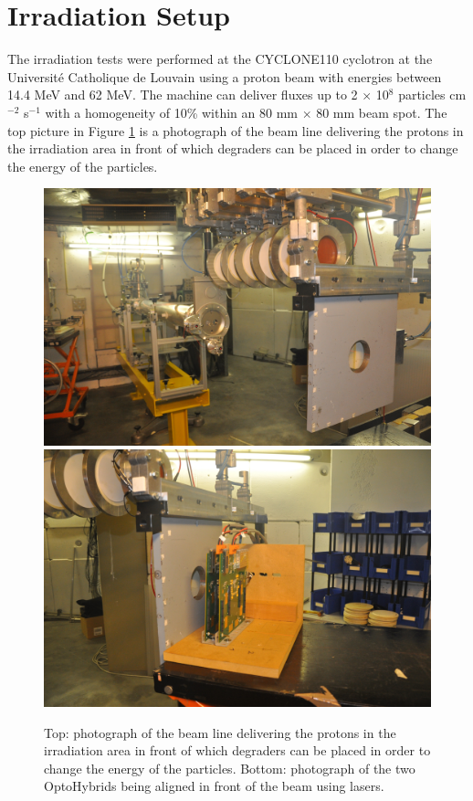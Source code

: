   \section{Irradiation Setup}

    The irradiation tests were performed at the CYCLONE110 cyclotron at the Université Catholique de Louvain \cite{CYCLOTRON} using a proton beam with energies between 14.4 MeV and 62 MeV. The machine can deliver fluxes up to 2 $ \times $ 10$^8$ particles cm$^{-2}$ s$^{-1}$ with a homogeneity of 10\% within an 80 mm $ \times $ 80 mm beam spot. The top picture in Figure \ref{fig:II-6-cyclotron} is a photograph of the beam line delivering the protons in the irradiation area in front of which degraders can be placed in order to change the energy of the particles. \\

    \begin{figure}[p!]
      \centering
      \includegraphics[width=\textwidth]{img/II-6-irradiation/cyclotron.jpg} \\
      \vspace*{0.4cm}
      \includegraphics[width=\textwidth]{img/II-6-irradiation/boards.jpg}
      \caption{Top: photograph of the beam line delivering the protons in the irradiation area in front of which degraders can be placed in order to change the energy of the particles. Bottom: photograph of the two OptoHybrids being aligned in front of the beam using lasers.}
      \label{fig:II-6-cyclotron}
    \end{figure}

